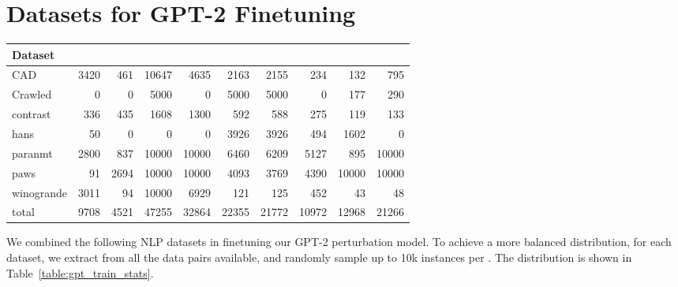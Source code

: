 \section{Datasets for GPT-2 Finetuning}
\label{appendix:train_data}

\begin{table*}
\small
\centering
\setlength{\tabcolsep}{3.5pt}
\begin{tabular}{lrrrrrrrrr}
\toprule
\textbf{Dataset} & \textbf{\ctrltag{negation}} & \textbf{\ctrltag{quantifier}} & \textbf{\ctrltag{leixcal}} & \textbf{\ctrltag{resemantic}} & \textbf{\ctrltag{insert}} & \textbf{\ctrltag{delete}} & \textbf{\ctrltag{restructure}} & \textbf{\ctrltag{shuffle}} & \emph{\ctrltag{global}} \\ 
\midrule
        CAD &      3420 &         461 &    10647 &        4635 &    2163 &    2155 &          234 &      132 &     795 \\
    Crawled &         0 &           0 &     5000 &           0 &    5000 &    5000 &            0 &      177 &     290 \\
   contrast &       336 &         435 &     1608 &        1300 &     592 &     588 &          275 &      119 &     133 \\
       hans &        50 &           0 &        0 &           0 &    3926 &    3926 &          494 &     1602 &       0 \\
    paranmt &      2800 &         837 &    10000 &       10000 &    6460 &    6209 &         5127 &      895 &   10000 \\
       paws &        91 &        2694 &    10000 &       10000 &    4093 &    3769 &         4390 &    10000 &   10000 \\
 winogrande &      3011 &          94 &    10000 &        6929 &     121 &     125 &          452 &       43 &      48 \\
      total &      9708 &        4521 &    47255 &       32864 &   22355 &   21772 &        10972 &    12968 &   21266 \\
\bottomrule
\end{tabular}
\caption{The datasets used for finetuning the GPT-2 perturbation model, and the \tagstr distributions.}
\label{table:gpt_train_stats}
\end{table*}


We combined the following NLP datasets in finetuning our GPT-2 perturbation model.
To achieve a more balanced distribution, for each dataset, we extract \tagstrs from all the data pairs available, and randomly sample up to 10k instances per \tagstr.
The distribution is shown in Table~\ref{table:gpt_train_stats}.

